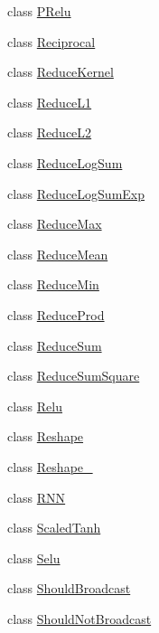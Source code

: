 \begin{DoxyCompactItemize}
\item 
class \mbox{\hyperlink{classonnxruntime_1_1cuda_1_1PRelu}{P\+Relu}}
\item 
class \mbox{\hyperlink{classonnxruntime_1_1cuda_1_1Reciprocal}{Reciprocal}}
\item 
class \mbox{\hyperlink{classonnxruntime_1_1cuda_1_1ReduceKernel}{Reduce\+Kernel}}
\item 
class \mbox{\hyperlink{classonnxruntime_1_1cuda_1_1ReduceL1}{Reduce\+L1}}
\item 
class \mbox{\hyperlink{classonnxruntime_1_1cuda_1_1ReduceL2}{Reduce\+L2}}
\item 
class \mbox{\hyperlink{classonnxruntime_1_1cuda_1_1ReduceLogSum}{Reduce\+Log\+Sum}}
\item 
class \mbox{\hyperlink{classonnxruntime_1_1cuda_1_1ReduceLogSumExp}{Reduce\+Log\+Sum\+Exp}}
\item 
class \mbox{\hyperlink{classonnxruntime_1_1cuda_1_1ReduceMax}{Reduce\+Max}}
\item 
class \mbox{\hyperlink{classonnxruntime_1_1cuda_1_1ReduceMean}{Reduce\+Mean}}
\item 
class \mbox{\hyperlink{classonnxruntime_1_1cuda_1_1ReduceMin}{Reduce\+Min}}
\item 
class \mbox{\hyperlink{classonnxruntime_1_1cuda_1_1ReduceProd}{Reduce\+Prod}}
\item 
class \mbox{\hyperlink{classonnxruntime_1_1cuda_1_1ReduceSum}{Reduce\+Sum}}
\item 
class \mbox{\hyperlink{classonnxruntime_1_1cuda_1_1ReduceSumSquare}{Reduce\+Sum\+Square}}
\item 
class \mbox{\hyperlink{classonnxruntime_1_1cuda_1_1Relu}{Relu}}
\item 
class \mbox{\hyperlink{classonnxruntime_1_1cuda_1_1Reshape}{Reshape}}
\item 
class \mbox{\hyperlink{classonnxruntime_1_1cuda_1_1Reshape__1}{Reshape\+\_}}
\item 
class \mbox{\hyperlink{classonnxruntime_1_1cuda_1_1RNN}{R\+NN}}
\item 
class \mbox{\hyperlink{classonnxruntime_1_1cuda_1_1ScaledTanh}{Scaled\+Tanh}}
\item 
class \mbox{\hyperlink{classonnxruntime_1_1cuda_1_1Selu}{Selu}}
\item 
class \mbox{\hyperlink{classonnxruntime_1_1cuda_1_1ShouldBroadcast}{Should\+Broadcast}}
\item 
class \mbox{\hyperlink{classonnxruntime_1_1cuda_1_1ShouldNotBroadcast}{Should\+Not\+Broadcast}}

\end{DoxyCompactItemize}
